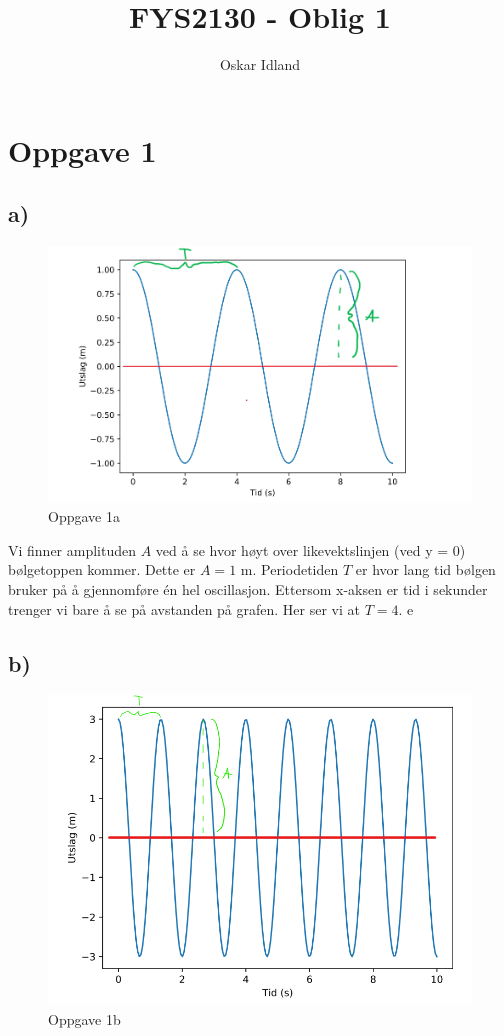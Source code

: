 \documentclass{article}
\author{Oskar Idland}
\title{FYS2130 - Oblig 1}
\date{}
\begin{document}
\maketitle
\newpage

\section*{Oppgave 1}
\subsection*{a)}
\begin{figure}[h!]
  \centering
  \includegraphics[scale = .5]{Figures/1.a.png}
  \caption{Oppgave 1a}
  \label{fig: 1a}
\end{figure}

Vi finner amplituden $A$ ved å se hvor høyt over likevektslinjen (ved y = 0) bølgetoppen kommer. Dette er $A = 1$ m. Periodetiden $T$ er hvor lang tid bølgen bruker på å gjennomføre én hel oscillasjon. Ettersom x-aksen er tid i sekunder trenger vi bare å se på avstanden på grafen. Her ser vi at $T = 4$.  e

\subsection*{b)}
\begin{figure}[h!]
  \centering
  \includegraphics[scale = .5]{Figures/1.b.png}
  \caption{Oppgave 1b}
  \label{fig: 1b}
\end{figure}
\end{document}
